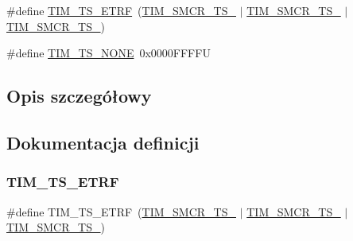\begin{DoxyCompactItemize}
\item 
\#define \hyperlink{group___t_i_m___trigger___selection_gaece08e02e056613a882aa7ff0a6ccc2d}{T\+I\+M\+\_\+\+T\+S\+\_\+\+E\+T\+RF}~(\hyperlink{group___peripheral___registers___bits___definition_ga8d1f040f9259acb3c2fba7b0c7eb3d96}{T\+I\+M\+\_\+\+S\+M\+C\+R\+\_\+\+T\+S\+\_} $\vert$ \hyperlink{group___peripheral___registers___bits___definition_gacb82212fcc89166a43ff97542da9182d}{T\+I\+M\+\_\+\+S\+M\+C\+R\+\_\+\+T\+S\+\_} $\vert$ \hyperlink{group___peripheral___registers___bits___definition_gacf0dbaf4a2ec8759f283f82a958ef6a8}{T\+I\+M\+\_\+\+S\+M\+C\+R\+\_\+\+T\+S\+\_})
\item 
\#define \hyperlink{group___t_i_m___trigger___selection_ga257bee9dc9f2f71a73124dd8c2329480}{T\+I\+M\+\_\+\+T\+S\+\_\+\+N\+O\+NE}~0x0000\+F\+F\+F\+FU
\end{DoxyCompactItemize}


\subsection{Opis szczegółowy}


\subsection{Dokumentacja definicji}
\mbox{\label{group___t_i_m___trigger___selection_gaece08e02e056613a882aa7ff0a6ccc2d}} 
\subsubsection{\texorpdfstring{T\+I\+M\+\_\+\+T\+S\+\_\+\+E\+T\+RF}{TIM\_TS\_ETRF}}
{\footnotesize\ttfamily \#define T\+I\+M\+\_\+\+T\+S\+\_\+\+E\+T\+RF~(\hyperlink{group___peripheral___registers___bits___definition_ga8d1f040f9259acb3c2fba7b0c7eb3d96}{T\+I\+M\+\_\+\+S\+M\+C\+R\+\_\+\+T\+S\+\_} $\vert$ \hyperlink{group___peripheral___registers___bits___definition_gacb82212fcc89166a43ff97542da9182d}{T\+I\+M\+\_\+\+S\+M\+C\+R\+\_\+\+T\+S\+\_} $\vert$ \hyperlink{group___peripheral___registers___bits___definition_gacf0dbaf4a2ec8759f283f82a958ef6a8}{T\+I\+M\+\_\+\+S\+M\+C\+R\+\_\+\+T\+S\+\_})}


